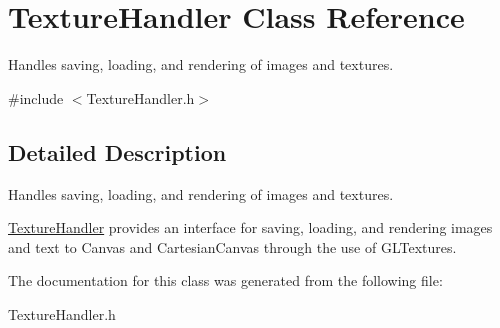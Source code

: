 \hypertarget{class_texture_handler}{}\section{Texture\+Handler Class Reference}
\label{class_texture_handler}


Handles saving, loading, and rendering of images and textures.  




{\ttfamily \#include $<$Texture\+Handler.\+h$>$}



\subsection{Detailed Description}
Handles saving, loading, and rendering of images and textures. 

\hyperlink{class_texture_handler}{Texture\+Handler} provides an interface for saving, loading, and rendering images and text to Canvas and Cartesian\+Canvas through the use of G\+L\+Textures. 

The documentation for this class was generated from the following file\+:\begin{DoxyCompactItemize}
\item 
Texture\+Handler.\+h\end{DoxyCompactItemize}
